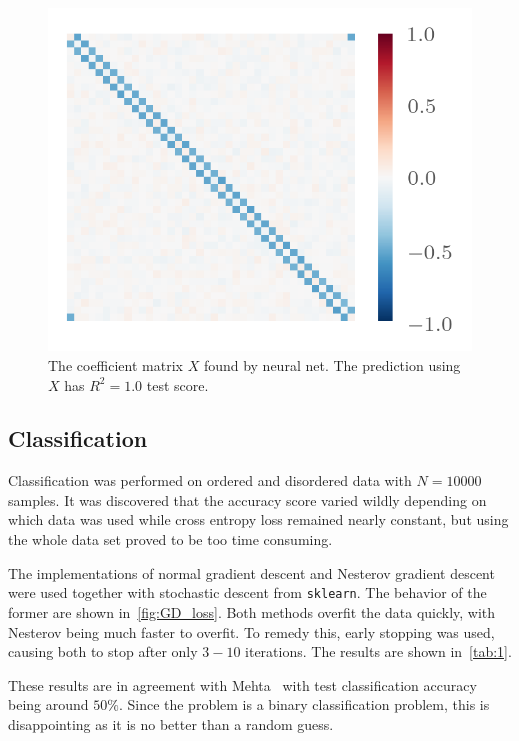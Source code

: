 \begin{figure}[H]
  \centering
  \includegraphics{figures/nnising.png}
  \caption{\label{fig:netreg} The coefficient matrix \(X\) found by neural net.
    The prediction using \(X\) has \(R^{2} = 1.0\) test score.}
\end{figure}


\subsection{Classification}

Classification was performed on ordered and disordered data with \(N=10 000\)
samples. It was discovered that the accuracy score varied wildly depending on which data
was used while cross entropy loss remained nearly constant, but using the whole
data set proved to be too time consuming.

The implementations of normal gradient descent and Nesterov gradient descent
were used together with stochastic descent from \texttt{sklearn}. The behavior
of the former are shown in~\cref{fig:GD_loss}. Both methods overfit the data
quickly, with Nesterov being much faster to overfit. To remedy this, early
stopping was used, causing both to stop after only \(3-10\) iterations. The
results are shown in~\cref{tab:1}.

These results are in agreement with Mehta~\cite{mehta} with test classification
accuracy being around \(50\%\). Since the problem is a binary classification
problem, this is disappointing as it is no better than a random guess.


